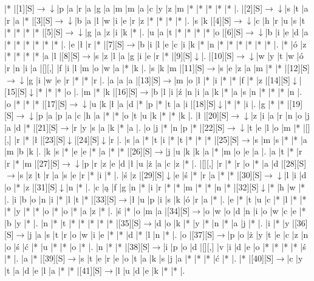 \documentclass[11pt]{article}
\newcommand\drarr{$\rightarrow \!\!\!\!\! \downarrow$}
\newcommand\rarr{$\rightarrow$}
\newcommand\darr{$\downarrow$}
\begin{document}
\noindent\begin{Puzzle}{19}{28}|*	|[1][S]\drarr	|p	|a	|r	|a	|g	|a	|m	|m	|a	|c	|y	|z	|m	|*	|*	|*	|*	|*	|.
|[2][S]\drarr	|s	|t	|a	|r	|a	|*	|[3][S]\drarr	|b	|a	|l	|w	|i	|e	|r	|z	|*	|*	|*	|*	|.
|s	|k	|[4][S]\drarr	|c	|h	|r	|u	|s	|t	|*	|*	|*	|*	|[5][S]\drarr	|g	|a	|z	|i	|k	|*	|.
|u	|a	|t	|*	|*	|*	|*	|o	|[6][S]\drarr	|b	|i	|e	|d	|a	|*	|*	|*	|*	|*	|*	|.
|e	|ł	|r	|*	|[7][S]\rarr	|b	|i	|l	|e	|c	|i	|k	|*	|n	|*	|*	|*	|*	|*	|*	|.
|*	|ó	|z	|*	|*	|*	|*	|a	|l	|[8][S]\rarr	|s	|z	|l	|a	|g	|i	|e	|r	|*	|[9][S]\darr	|.
|[10][S]\drarr	|w	|y	|t	|w	|ó	|r	|n	|i	|a	|[][,]{ }	|f	|i	|l	|m	|o	|w	|a	|*	|k	|.
|s	|k	|m	|[11][S]\rarr	|s	|e	|z	|a	|m	|*	|*	|[12][S]\drarr	|g	|i	|w	|e	|r	|*	|*	|r	|.
|a	|a	|a	|[13][S]\rarr	|m	|o	|l	|*	|i	|*	|*	|f	|*	|z	|[14][S]\darr	|[15][S]\darr	|*	|*	|*	|o	|.
|m	|*	|k	|[16][S]\rarr	|b	|l	|i	|ź	|n	|i	|a	|k	|*	|a	|s	|n	|*	|*	|*	|n	|.
|o	|*	|*	|*	|[17][S]\drarr	|u	|k	|ł	|a	|d	|*	|p	|*	|t	|a	|i	|[18][S]\darr	|*	|*	|i	|.
|g	|*	|*	|[19][S]\drarr	|p	|a	|p	|a	|c	|h	|a	|*	|*	|o	|t	|u	|k	|*	|*	|k	|.
|ł	|[20][S]\drarr	|z	|i	|a	|r	|n	|o	|j	|a	|d	|*	|[21][S]\rarr	|r	|y	|s	|a	|k	|*	|a	|.
|o	|j	|*	|n	|p	|*	|[22][S]\drarr	|t	|e	|l	|o	|m	|*	|[][,]{ }	|r	|*	|ł	|[23][S]\darr	|[24][S]\darr	|r	|.
|s	|a	|*	|t	|i	|*	|t	|*	|*	|*	|[25][S]\rarr	|s	|m	|s	|*	|*	|a	|m	|b	|k	|.
|k	|s	|*	|e	|e	|*	|a	|*	|*	|[26][S]\rarr	|j	|u	|k	|k	|a	|*	|m	|o	|e	|a	|.
|a	|t	|*	|r	|r	|*	|m	|[27][S]\drarr	|p	|r	|z	|e	|d	|ł	|u	|ż	|a	|c	|z	|*	|.
|[][,]{ }	|r	|*	|r	|o	|*	|a	|d	|[28][S]\rarr	|s	|z	|t	|r	|a	|s	|e	|r	|*	|i	|*	|.
|ś	|z	|[29][S]\darr	|e	|ś	|*	|r	|a	|*	|*	|[30][S]\drarr	|l	|i	|d	|o	|*	|z	|[31][S]\darr	|n	|*	|.
|c	|ą	|f	|g	|n	|*	|i	|r	|*	|*	|m	|*	|*	|n	|*	|[32][S]\darr	|*	|h	|w	|*	|.
|i	|b	|o	|n	|i	|*	|l	|t	|*	|[33][S]\rarr	|ł	|u	|p	|i	|s	|k	|ó	|r	|a	|*	|.
|e	|*	|t	|u	|c	|*	|l	|*	|*	|*	|y	|*	|*	|o	|*	|o	|*	|a	|z	|*	|.
|ś	|*	|o	|m	|a	|[34][S]\rarr	|o	|w	|o	|d	|n	|i	|o	|w	|c	|e	|*	|b	|y	|*	|.
|n	|*	|t	|*	|*	|*	|*	|*	|[35][S]\rarr	|d	|o	|k	|*	|y	|*	|n	|*	|a	|j	|*	|.
|i	|*	|y	|[36][S]\rarr	|j	|a	|s	|t	|r	|o	|w	|i	|e	|*	|*	|d	|*	|l	|n	|*	|.
|o	|[37][S]\rarr	|p	|o	|ż	|y	|t	|e	|c	|z	|n	|o	|ś	|ć	|*	|u	|*	|*	|o	|*	|.
|n	|*	|*	|[38][S]\rarr	|i	|p	|o	|d	|[][,]{ }	|v	|i	|d	|e	|o	|*	|*	|*	|*	|ś	|*	|.
|a	|*	|[39][S]\rarr	|s	|t	|e	|r	|e	|o	|t	|a	|k	|s	|j	|a	|*	|*	|*	|ć	|*	|.
|*	|[40][S]\rarr	|c	|y	|t	|a	|d	|e	|l	|a	|*	|*	|[41][S]\rarr	|l	|u	|d	|e	|k	|*	|*	|.\end{Puzzle}

\newpage
\end{document}
